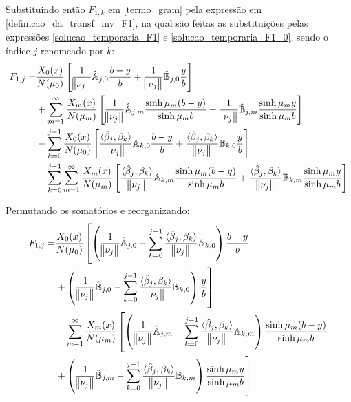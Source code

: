 Substituindo então $F_{1,k}$ em \eqref{termo_gram} pela expressão em \eqref{definicao_da_transf_inv_F1}, na qual são feitas as substituições pelas expressões \eqref{solucao_temporaria_F1} e \eqref{solucao_temporaria_F1_0}, sendo o índice $j$ renomeado por $k$:
\begin{align}
F_{1,j} = & \frac{X_0(x)}{N(\mu_0)}\left[\frac{1}{\norm{\nu_j}} \hat{\mathbb{A}}_{j,0}\frac{b - y}{b} + \frac{1}{\norm{\nu_j}} \hat{\mathbb{B}}_{j,0}\frac{y}{b}\right] \nonumber \\
& + \sum_{m=1}^\infty \frac{X_m(x)}{N(\mu_m)}\left[\frac{1}{\norm{\nu_j}} \hat{\mathbb{A}}_{j,m}\frac{\sinh\mu_m (b - y)}{\sinh\mu_m b} + \frac{1}{\norm{\nu_j}} \hat{\mathbb{B}}_{j,m}\frac{\sinh\mu_m y}{\sinh\mu_m b}\right] \nonumber \\
& - \sum_{k=0}^{j-1} \frac{X_0(x)}{N(\mu_0)}\left[\frac{\langle \hat{\beta}_j, \beta_k \rangle}{\norm{\nu_j}} \mathbb{A}_{k,0}\frac{b - y}{b} + \frac{\langle \hat{\beta}_j, \beta_k \rangle}{\norm{\nu_j}} \mathbb{B}_{k,0}\frac{y}{b}\right] \nonumber \\
& - \sum_{k=0}^{j-1} \sum_{m=1}^\infty \frac{X_m(x)}{N(\mu_m)}\left[\frac{\langle \hat{\beta}_j, \beta_k \rangle}{\norm{\nu_j}} \mathbb{A}_{k,m}\frac{\sinh\mu_m (b - y)}{\sinh\mu_m b} + \frac{\langle \hat{\beta}_j, \beta_k \rangle}{\norm{\nu_j}} \mathbb{B}_{k,m}\frac{\sinh\mu_m y}{\sinh\mu_m b}\right]
\end{align}

Permutando os somatórios e reorganizando:
\begin{align}
F_{1,j} = & \frac{X_0(x)}{N(\mu_0)}\left[ \left(\frac{1}{\norm{\nu_j}} \hat{\mathbb{A}}_{j,0} - \sum_{k=0}^{j-1} \frac{\langle \hat{\beta}_j, \beta_k \rangle}{\norm{\nu_j}} \mathbb{A}_{k,0}\right)\frac{b - y}{b} \right. \nonumber \\
& \left. + \left(\frac{1}{\norm{\nu_j}} \hat{\mathbb{B}}_{j,0} - \sum_{k=0}^{j-1} \frac{\langle \hat{\beta}_j, \beta_k \rangle}{\norm{\nu_j}} \mathbb{B}_{k,0}\right)\frac{y}{b} \right] \nonumber \\
& + \sum_{m=1}^\infty \frac{X_m(x)}{N(\mu_m)}\left[ \left(\frac{1}{\norm{\nu_j}} \hat{\mathbb{A}}_{j,m} - \sum_{k=0}^{j-1} \frac{\langle \hat{\beta}_j, \beta_k \rangle}{\norm{\nu_j}} \mathbb{A}_{k,m}\right)\frac{\sinh\mu_m (b - y)}{\sinh\mu_m b} \right. \nonumber \\
& \left. + \left(\frac{1}{\norm{\nu_j}} \hat{\mathbb{B}}_{j,m} - \sum_{k=0}^{j-1} \frac{\langle \hat{\beta}_j, \beta_k \rangle}{\norm{\nu_j}} \mathbb{B}_{k,m}\right)\frac{\sinh\mu_m y}{\sinh\mu_m b} \right] \label{equacao_para_comparar_1}
\end{align}

